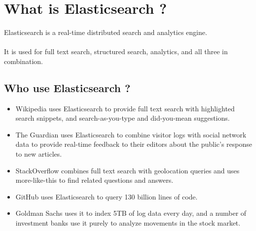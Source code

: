 \documentclass{article}%
\title{\titreEntete{}}%
\author{\href{mailto:romain.pignolet.pro@gmail.com}{{\LARGE P}IGNOLET Romain}}%
\date{\datec{}}%
\makeatletter
\def\maketitle{%
	\null
	\thispagestyle{empty}%
	\vfill
	\begin{center}\leavevmode
		\normalfont
		{\LARGE \textbf{\@title}\par}%
		\vskip 1cm
		{\Large \@author\par}%
		\vskip 1cm
		{\Large \@date\par}%
		\vskip 3cm%

	\end{center}%
	\vfill%
	\null%
	\cleardoublepage%
}
\makeatother
\begin{document}
%
%
\tableofcontents%
%
%
%
%
\newpage%



\section{What is Elasticsearch ?}

\paragraph{} Elasticsearch is a real-time distributed search and analytics engine.

\paragraph{} It is used for full text search, structured search, analytics, and all three in combination.

\subsection{Who use Elasticsearch ?}

\begin{itemize}
	\item Wikipedia uses Elasticsearch to provide full text search with highlighted search snippets, and search-as-you-type and did-you-mean suggestions.
	\item The Guardian uses Elasticsearch to combine visitor logs with social network data to provide real-time feedback to their editors about the public’s response to new articles.
	\item StackOverflow combines full text search with geolocation queries and uses more-like-this to find related questions and answers.
	\item GitHub uses Elasticsearch to query 130 billion lines of code.
	\item Goldman Sachs uses it to index 5TB of log data every day, and a number of investment banks use it purely to analyze movements in the stock market.
\end{itemize}
\end{document}

